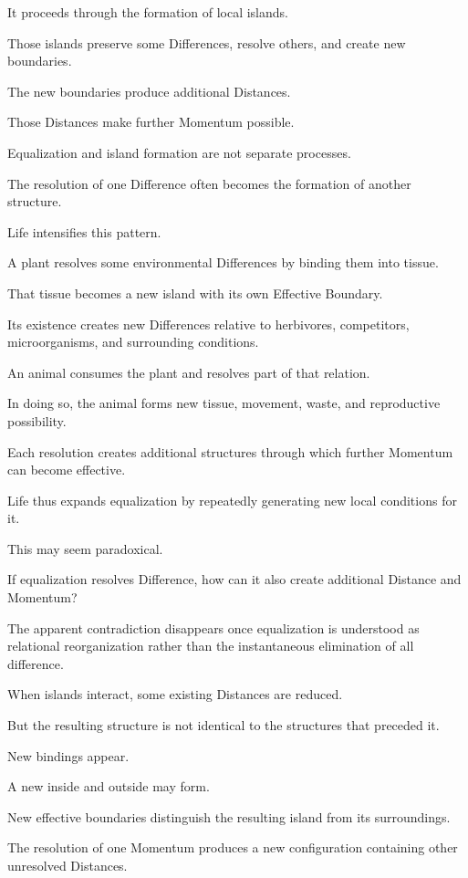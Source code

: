 It proceeds through the formation of local islands.

Those islands preserve some Differences, resolve others, and create new boundaries.

The new boundaries produce additional Distances.

Those Distances make further Momentum possible.

Equalization and island formation are not separate processes.

The resolution of one Difference often becomes the formation of another structure.

Life intensifies this pattern.

A plant resolves some environmental Differences by binding them into tissue.

That tissue becomes a new island with its own Effective Boundary.

Its existence creates new Differences relative to herbivores, competitors, microorganisms, and surrounding conditions.

An animal consumes the plant and resolves part of that relation.

In doing so, the animal forms new tissue, movement, waste, and reproductive possibility.

Each resolution creates additional structures through which further Momentum can become effective.

Life thus expands equalization by repeatedly generating new local conditions for it.

This may seem paradoxical.

If equalization resolves Difference, how can it also create additional Distance and Momentum?

The apparent contradiction disappears once equalization is understood as relational reorganization rather than the instantaneous elimination of all difference.

When islands interact, some existing Distances are reduced.

But the resulting structure is not identical to the structures that preceded it.

New bindings appear.

A new inside and outside may form.

New effective boundaries distinguish the resulting island from its surroundings.

The resolution of one Momentum produces a new configuration containing other unresolved Distances.


